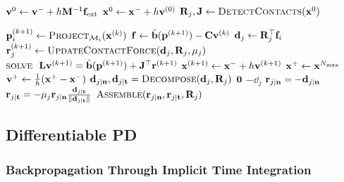 \begin{algorithm}[H]
\caption{Projective Dynamics step with dry frictional contact.}
\label{alg:PD_dry_frictional_contact}
\begin{algorithmic}[1]
\addtolength{\itemsep}{0.5ex}
    \State $\mathbf{v}^0 \gets \mathbf{v}^- + h\mathbf{M}^{-1}\mathbf{f}_{\text{ext}}$
    \State $\mathbf{x}^0 \gets \mathbf{x}^{-} + h \mathbf{v}^{(0)}$
    \State $\mathbf{R}_j, \mathbf{J} \gets \textsc{DetectContacts}(\mathbf{x}^0)$

        \State $\mathbf{p}_i^{(k+1)} \gets \textsc{Project}_{\mathcal{M}_i}(\mathbf{x}^{(k)})$
        \EndFor
        \State $\mathbf{f} \gets \tilde{\mathbf{b}}(\mathbf{p}^{(k+1)}) - \mathbf{C}\mathbf{v}^{(k)}$
        \State $\mathbf{d}_j \gets \mathbf{R}_j^\top\mathbf{f}_i$
        \State $\mathbf{r}_j^{(k+1)} \gets \textsc{UpdateContactForce}(\mathbf{d}_j, \mathbf{R}_j, \mu_j)$
        \EndFor
    \State $\textsc{solve }\; \mathbf{L} \mathbf{v}^{(k+1)} = \tilde{\mathbf{b}}(\mathbf{p}^{(k+1)}) + \mathbf{J}^\top \mathbf{r}^{(k+1)}$
    \State $\mathbf{x}^{(k+1)} \gets \mathbf{x}^{-} + h\mathbf{v}^{(k+1)}$
    \EndFor
\State $\mathbf{x}^+ \gets \mathbf{x}^{N_{\text{max}}}$
\State $\mathbf{v}^+ \gets \frac{1}{h}(\mathbf{x}^+ - \mathbf{x}^-)$
\EndFunction
\Statex
{}
    \State $\mathbf{d}_{j\mid \mathbf{n}}, \mathbf{d}_{j\mid \mathbf{t}} = \textsc{Decompose}(\mathbf{d}_j, \mathbf{R}_j)$
        \State \Return $\mathbf{0}$
    \EndIf
        \State \Return $-\dd_j$
    \Else
        \State $\mathbf{r}_{j\mid \mathbf{n}} = -\mathbf{d}_{j\mid \mathbf{n}}$
        \State $\mathbf{r}_{j\mid \mathbf{t}} = -\mu_j \mathbf{r}_{j\mid \mathbf{n}}
        \frac{\mathbf{d}_{j\mid \mathbf{t}}}
        {\|\mathbf{d}_{j\mid \mathbf{t}}\|}$
        \State \Return $\textsc{Assemble}(\mathbf{r}_{j\mid \mathbf{n}}, \mathbf{r}_{j\mid \mathbf{t}}, \mathbf{R}_j)$
    \EndIf
\EndFunction
\end{algorithmic}
\end{algorithm}

\subsection{Differentiable PD}

\subsubsection{Backpropagation Through Implicit Time Integration}

